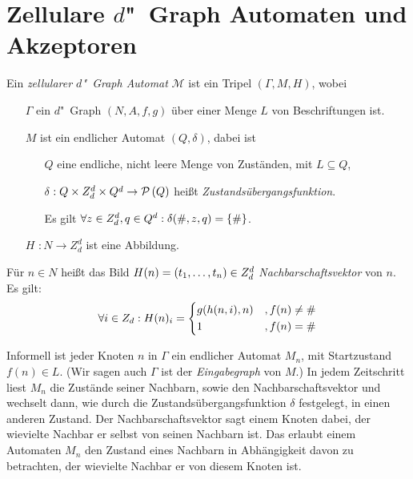 \documentclass[11pt]{article}
\newcommand{\defWord}[1]{\emph{#1}}
\begin{document}
\section{Zellulare $d$"~Graph Automaten und Akzeptoren}

\begin{definition}
	Ein \defWord{zellularer $d$"~Graph Automat} $\mathcal{M}$ ist ein Tripel $\left(\Gamma, M, H\right)$, wobei
	\begin{itemize}
		\item[$\Gamma$] ein $d$"~Graph $\left(N, A, f, g\right)$ über einer Menge $L$ von Beschriftungen ist.
		\item[$M$] ist ein endlicher Automat $\left(Q, \delta\right)$, dabei ist 
		\begin{itemize}
			\item[$Q$] eine endliche, nicht leere Menge von Zuständen, mit $L \subseteq Q$,
			\item[$\delta$] $\cramped{: Q \times Z_d^d \times Q^d \rightarrow \mathcal{P}\left(Q\right)}$  heißt \defWord{Zustandsübergangsfunktion}.
			
			Es gilt $\forall z \in Z_d^d, q \in Q^d : \cramped{\delta(\#, z, q) = \{\# \}}$.
		\end{itemize}
		\item[$H$] $: N \rightarrow Z_d^d$ ist eine Abbildung.  
	\end{itemize}
		Für $n \in N$ heißt das Bild $H(n) = \left(t_1, \text{\dots}, t_n\right) \in Z_d^d$ \defWord{Nachbarschaftsvektor} von $n$. Es gilt: 
		\begin{displaymath}
			\forall i \in Z_d : H(n)_i = 
			\begin{dcases}
				g(h(n, i), n) & ,f(n) \neq \# \\
				1 & , f(n) = \# \\ %
			\end{dcases}
		\end{displaymath}
\end{definition}

Informell ist jeder Knoten $n$ in $\Gamma$ ein endlicher Automat $M_n$, mit Startzustand $f(n) \in L$. 
(Wir sagen auch $\Gamma$ ist der \defWord{Eingabegraph} von $M$.) 
In jedem Zeitschritt liest $M_n$ die Zustände seiner Nachbarn, sowie den Nachbarschaftsvektor und wechselt dann, wie durch die Zustandsübergangsfunktion $\delta$ festgelegt, in einen anderen Zustand. 
Der Nachbarschaftsvektor sagt einem Knoten dabei, der wievielte Nachbar er selbst von seinen Nachbarn ist.  
Das erlaubt einem Automaten $M_n$ den Zustand eines Nachbarn in Abhängigkeit davon zu betrachten, der wievielte Nachbar er von diesem Knoten ist.
\end{document}
